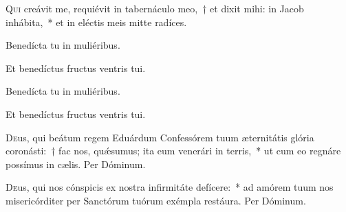 \documentclass[vesperale_romanum.tex]{subfiles}
\begin{document}


\lettrine{Q}{ui} creávit me, requiévit in tabernáculo meo,~† et dixit mihi: in Jacob inhábita,~* et in eléctis meis mitte radíces.


\vv Benedícta tu in muliéribus.

\rr Et benedíctus fructus ventris tui.

\admagnificat



\oratio






\vv Benedícta tu in muliéribus.

\rr Et benedíctus fructus ventris tui.

\admagnificat


\myrule


\semiduplexmtv

\oratio

\lettrine{D}{e}us, qui beátum regem Eduárdum Confessórem tuum æternitátis glória coronásti:~† fac nos, quǽsumus; ita eum venerári in terris,~* ut cum eo regnáre possímus in cælis. Per Dóminum.

\vespsequentiscomm

\myrule

\newpage


\duplex

\oratio

\lettrine{D}{e}us, qui nos cónspicis ex nostra infirmitáte defícere:~* ad amórem tuum nos misericórditer per Sanctórum tuórum exémpla restáura. Per Dóminum.
\end{document}
